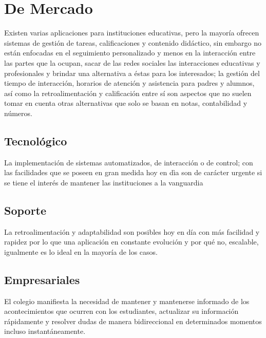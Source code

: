 \section{De Mercado}
\hspace{1.47cm}Existen varias aplicaciones para instituciones educativas, pero la mayoría ofrecen sistemas de gestión de tareas, calificaciones y contenido didáctico, sin embargo no están enfocadas en el seguimiento personalizado y menos en la interacción entre las partes que la ocupan, sacar de las redes sociales las interacciones educativas y profesionales y brindar una alternativa a éstas para los interesados; la gestión del tiempo de interacción, horarios de atención y asistencia para padres y alumnos, así como la retroalimentación y calificación entre sí son aspectos que no suelen tomar en cuenta otras alternativas que solo se basan en notas, contabilidad y números.
\subsection{Tecnológico}
\hspace{1.47cm}La implementación de sistemas automatizados, de interacción o de control; con las facilidades que se poseen en gran medida hoy en dìa son de carácter urgente si se tiene el interés de mantener las instituciones a la vanguardia
\subsection{Soporte}
\hspace{1.47cm}La retroalimentación y adaptabilidad son posibles hoy en día con más facilidad y rapidez por lo que una aplicación en constante evolución y por qué no, escalable, igualmente es lo ideal en la mayoría de los casos.
\subsection{Empresariales}
\hspace{1.47cm}El colegio manifiesta la necesidad de mantener y mantenerse informado de los acontecimientos que ocurren con los estudiantes, actualizar su información rápidamente y resolver dudas de manera bidireccional en determinados momentos incluso instantáneamente.